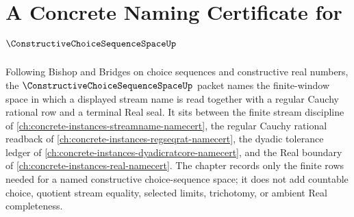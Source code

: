 \chapter{A Concrete Naming Certificate for $\ConstructiveChoiceSequenceSpaceUp$}
\label{ch:concrete-instances-constructive-choice-sequence-space-namecert}

Following Bishop and Bridges on choice sequences and constructive real numbers, the $\ConstructiveChoiceSequenceSpaceUp$ packet names the finite-window space in which a displayed stream name is read together with a regular Cauchy rational row and a terminal Real seal. It sits between the finite stream discipline of \autoref{ch:concrete-instances-streamname-namecert}, the regular Cauchy rational readback of \autoref{ch:concrete-instances-regseqrat-namecert}, the dyadic tolerance ledger of \autoref{ch:concrete-instances-dyadicratcore-namecert}, and the Real boundary of \autoref{ch:concrete-instances-real-namecert}. The chapter records only the finite rows needed for a named constructive choice-sequence space; it does not add countable choice, quotient stream equality, selected limits, trichotomy, or ambient Real completeness.

